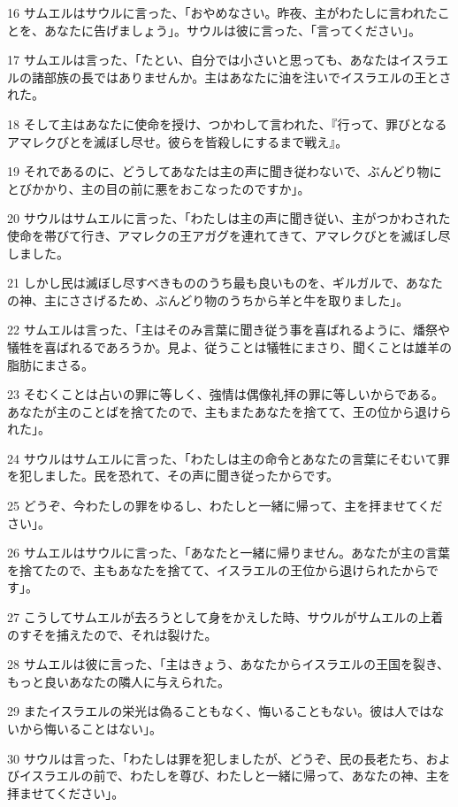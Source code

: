 \par 16 サムエルはサウルに言った、「おやめなさい。昨夜、主がわたしに言われたことを、あなたに告げましょう」。サウルは彼に言った、「言ってください」。
\par 17 サムエルは言った、「たとい、自分では小さいと思っても、あなたはイスラエルの諸部族の長ではありませんか。主はあなたに油を注いでイスラエルの王とされた。
\par 18 そして主はあなたに使命を授け、つかわして言われた、『行って、罪びとなるアマレクびとを滅ぼし尽せ。彼らを皆殺しにするまで戦え』。
\par 19 それであるのに、どうしてあなたは主の声に聞き従わないで、ぶんどり物にとびかかり、主の目の前に悪をおこなったのですか」。
\par 20 サウルはサムエルに言った、「わたしは主の声に聞き従い、主がつかわされた使命を帯びて行き、アマレクの王アガグを連れてきて、アマレクびとを滅ぼし尽しました。
\par 21 しかし民は滅ぼし尽すべきもののうち最も良いものを、ギルガルで、あなたの神、主にささげるため、ぶんどり物のうちから羊と牛を取りました」。
\par 22 サムエルは言った、「主はそのみ言葉に聞き従う事を喜ばれるように、燔祭や犠牲を喜ばれるであろうか。見よ、従うことは犠牲にまさり、聞くことは雄羊の脂肪にまさる。
\par 23 そむくことは占いの罪に等しく、強情は偶像礼拝の罪に等しいからである。あなたが主のことばを捨てたので、主もまたあなたを捨てて、王の位から退けられた」。
\par 24 サウルはサムエルに言った、「わたしは主の命令とあなたの言葉にそむいて罪を犯しました。民を恐れて、その声に聞き従ったからです。
\par 25 どうぞ、今わたしの罪をゆるし、わたしと一緒に帰って、主を拝ませてください」。
\par 26 サムエルはサウルに言った、「あなたと一緒に帰りません。あなたが主の言葉を捨てたので、主もあなたを捨てて、イスラエルの王位から退けられたからです」。
\par 27 こうしてサムエルが去ろうとして身をかえした時、サウルがサムエルの上着のすそを捕えたので、それは裂けた。
\par 28 サムエルは彼に言った、「主はきょう、あなたからイスラエルの王国を裂き、もっと良いあなたの隣人に与えられた。
\par 29 またイスラエルの栄光は偽ることもなく、悔いることもない。彼は人ではないから悔いることはない」。
\par 30 サウルは言った、「わたしは罪を犯しましたが、どうぞ、民の長老たち、およびイスラエルの前で、わたしを尊び、わたしと一緒に帰って、あなたの神、主を拝ませてください」。
